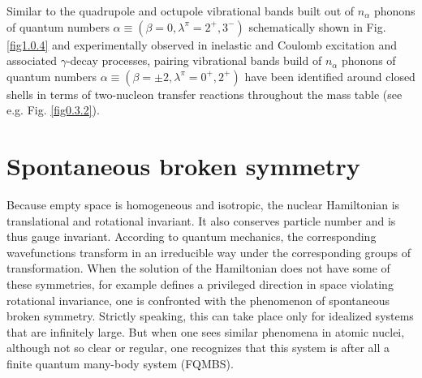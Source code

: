 \documentclass[a4paper,11pt]{book}
\numberwithin{equation}{section}
\numberwithin{figure}{section}
\numberwithin{table}{section}
\begin{document}
Similar to the quadrupole and octupole vibrational bands built out of $n_\alpha$ phonons of quantum numbers $\alpha\equiv(\beta=0,\lambda^\pi=2^+,3^-)$ schematically shown in Fig. \ref{fig1.0.4} and experimentally observed in inelastic and Coulomb excitation and associated $\gamma$-decay processes, pairing vibrational bands build of $n_\alpha$ phonons of quantum numbers $\alpha\equiv(\beta=\pm2,\lambda^\pi=0^+,2^+)$ have been identified around closed shells in terms of two-nucleon transfer reactions throughout the mass table (see e.g. Fig. \ref{fig0.3.2}).
\section{Spontaneous broken symmetry}
Because empty space is homogeneous and isotropic, the nuclear Hamiltonian is translational and rotational invariant. It also conserves particle number and is thus gauge invariant. According to quantum mechanics, the corresponding wavefunctions transform in an irreducible way under the corresponding groups of transformation.
When the solution  of the Hamiltonian does not have some of these symmetries, for example defines a privileged direction in space violating rotational invariance, one is confronted with the phenomenon of spontaneous broken symmetry. Strictly speaking, this can take place only for idealized systems that are infinitely large. But when one sees similar phenomena in atomic nuclei, although not so clear or regular, one recognizes that this system is after all a finite quantum many-body system (FQMBS).
\end{document}
